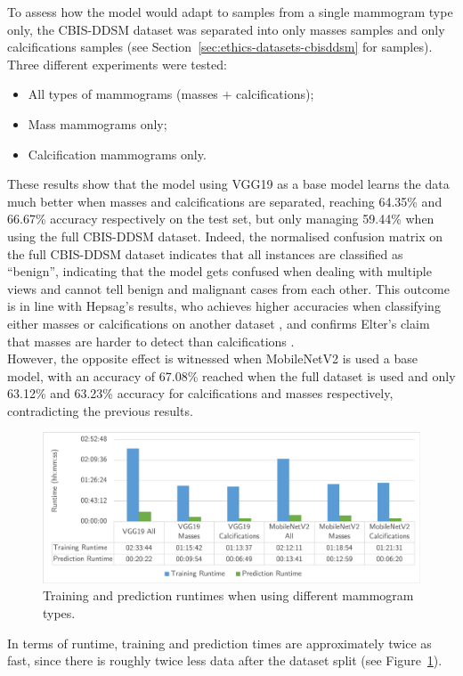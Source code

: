 To assess how the model would adapt to samples from a single mammogram type only, the CBIS-DDSM dataset was separated into only masses samples and only calcifications samples (see Section~\ref{sec:ethics-datasets-cbisddsm} for samples). Three different experiments were tested:
\begin{itemize}
    \item All types of mammograms (masses + calcifications);
    \item Mass mammograms only;
    \item Calcification mammograms only.
\end{itemize}



These results show that the model using VGG19 as a base model learns the data much better when masses and calcifications are separated, reaching 64.35\% and 66.67\% accuracy respectively on the test set, but only managing 59.44\% when using the full CBIS-DDSM dataset. Indeed, the normalised confusion matrix on the full CBIS-DDSM dataset indicates that all instances are classified as ``benign'', indicating that the model gets confused when dealing with multiple views and cannot tell benign and malignant cases from each other. This outcome is in line with Hepsag's results, who achieves higher accuracies when classifying either masses or calcifications on another dataset \citep{Hepsag2017}, and confirms Elter's claim that masses are harder to detect than calcifications \citep{Elter2009}.\\

However, the opposite effect is witnessed when MobileNetV2 is used a base model, with an accuracy of 67.08\% reached when the full dataset is used and only 63.12\% and 63.23\% accuracy for calcifications and masses respectively, contradicting the previous results.

\begin{figure}[ht]
\centerline{\includegraphics[width=\textwidth]{figures/evaluation/mammogram_type_experiment/runtimes.png}}
\caption{\label{fig:evaluation-mammogram_type_experiment-runtimes.png}Training and prediction runtimes when using different mammogram types.}
\end{figure}

In terms of runtime, training and prediction times are approximately twice as fast, since there is roughly twice less data after the dataset split (see Figure~\ref{fig:evaluation-mammogram_type_experiment-runtimes.png}).
